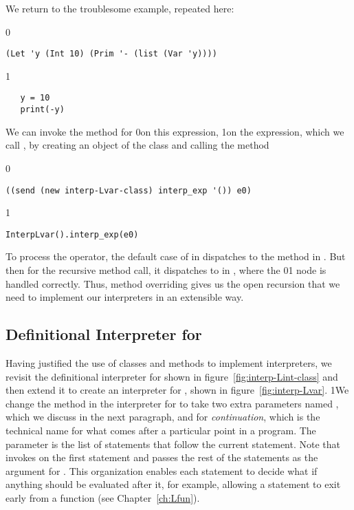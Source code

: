 \documentclass[7x10]{TimesAPriori_MIT}%
\def\racketEd{0}
\def\pythonEd{1}
\def\edition{1}
\newcommand{\racket}[1]{{\if\edition\racketEd{#1}\fi}}
\newcommand{\pythonColor}[0]{}
\newcommand{\python}[1]{{\if\edition\pythonEd\pythonColor #1\fi}}
\numberwithin{theorem}{chapter}
\numberwithin{definition}{chapter}
\numberwithin{equation}{chapter}
\begin{document}
We return to the troublesome example, repeated here:
{\if\edition\racketEd  
\begin{lstlisting}
(Let 'y (Int 10) (Prim '- (list (Var 'y))))
\end{lstlisting}
\fi}
{\if\edition\pythonEd\pythonColor
\begin{lstlisting}
   y = 10
   print(-y)
\end{lstlisting}
\fi}
\noindent We can invoke the  method for \LangVar{}
\racket{on this expression,}%
\python{on the  expression,}
%
which we call , by creating an object of the \LangVar{} class
and calling the  method
{\if\edition\racketEd
\begin{lstlisting}
((send (new interp-Lvar-class) interp_exp '()) e0)
\end{lstlisting}
\fi}
{\if\edition\pythonEd\pythonColor
\begin{lstlisting}
InterpLvar().interp_exp(e0)
\end{lstlisting}
\fi}
\noindent To process the \code{-} operator, the default case of
 in \LangVar{} dispatches to the 
method in \LangInt{}. But then for the recursive method call, it
dispatches to  in \LangVar{}, where the
\racket{}\python{} node is handled correctly.
Thus, method overriding gives us the open recursion that we need to
implement our interpreters in an extensible way.


\subsection{Definitional Interpreter for \LangVar{}}
\label{sec:interp-Lvar}

Having justified the use of classes and methods to implement
interpreters, we revisit the definitional interpreter for \LangInt{}
shown in figure~\ref{fig:interp-Lint-class} and then extend it to
create an interpreter for \LangVar{}, shown in
figure~\ref{fig:interp-Lvar}.
%
\python{We change the  method in the interpreter
  for \LangInt{} to take two extra parameters named \code{env}, which
  we discuss in the next paragraph, and \code{cont} for
  \emph{continuation}, which is the technical name for what comes
  after a particular point in a program. The \code{cont} parameter is
  the list of statements that follow the current statement.  Note
  that \code{interp\_stmts} invokes \code{interp\_stmt} on the first
  statement and passes the rest of the statements as the argument for
  \code{cont}. This organization enables each statement to decide what
  if anything should be evaluated after it, for example, allowing a
  \code{return} statement to exit early from a function (see
  Chapter~\ref{ch:Lfun}).}
\end{document}
